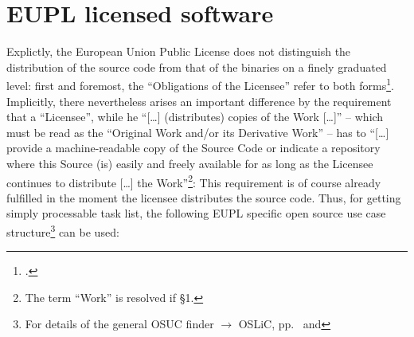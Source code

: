 %
%
%
%
%



\section{EUPL licensed software}

Explictly, the European Union Public License does not distinguish the
distribution of the source code from that of the binaries on a finely graduated
level: first and foremost, the \enquote{Obligations of the Licensee} refer to
both forms\footcite[cf.][\nopage wp\ §5]{EuplLicense2007en}. Implicitly, there
nevertheless arises an important difference by the requirement that a
\enquote{Licensee}, while he \enquote{[\ldots] (distributes) copies of the Work
[\ldots]} -- which must be read as the \enquote{Original Work and/or its
Derivative Work} -- has to \enquote{[\ldots] provide a machine-readable copy of
the Source Code or indicate a repository where this Source (is) easily and
freely available for as long as the Licensee continues to distribute [\ldots]
the Work}\footnote{\cite[cf.][\nopage wp\ §5]{EuplLicense2007en} The term
\enquote{Work} is resolved if §1.}: This requirement is of course already
fulfilled in the moment the licensee distributes the source code. Thus, for
getting simply processable task list, the following EUPL specific open source
use case structure\footnote{For details of the general OSUC finder $\rightarrow$
OSLiC, pp.\ \pageref{OsucTokens} and \pageref{OsucDefinitionTree}} can be used:
 
